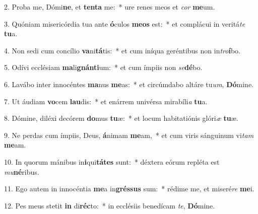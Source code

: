 2. Proba me, Dómi\textbf{ne}, et \textbf{ten}\textbf{ta} me:~*  ure renes meos et \textit{cor} \textbf{me}um.\

3. Quóniam misericórdia tua ante \textbf{ó}culos \textbf{me}\textbf{os} est:~*  et complácui in veritá\textit{te} \textbf{tu}a.\

4. Non sedi cum concílio \textbf{va}ni\textbf{tá}tis:~*  et cum iníqua geréntibus non in\textit{tro}\textbf{í}bo.\

5. Odívi ecclésiam \textbf{ma}li\textbf{gnán}\textbf{ti}um:~*  et cum ímpiis non \textit{se}\textbf{dé}bo.\

6. Lavábo inter innocéntes \textbf{ma}nus \textbf{me}as:~*  et circúmdabo altáre tu\textit{um}, \textbf{Dó}mine.\

7. Ut áudiam \textbf{vo}cem \textbf{lau}dis:~*  et enárrem univérsa mirabíli\textit{a} \textbf{tu}a.\

8. Dómine, diléxi decórem \textbf{do}mus \textbf{tu}æ:~*  et locum habitatiónis glóri\textit{æ} \textbf{tu}æ.\

9. Ne perdas cum ímpiis, Deus, \textbf{á}nimam \textbf{me}am,~*  et cum viris sánguinum vi\textit{tam} \textbf{me}am.\

10. In quorum mánibus in\textbf{i}qui\textbf{tá}\textbf{tes} sunt:~*  déxtera eórum repléta est \textit{mu}\textbf{né}ribus.\

11. Ego autem in innocéntia \textbf{me}a in\textbf{grés}\textbf{sus} sum:~*  rédime me, et miseré\textit{re} \textbf{me}i.\

12. Pes meus stetit \textbf{in} di\textbf{réc}to:~*  in ecclésiis benedícam \textit{te}, \textbf{Dó}mine.\

